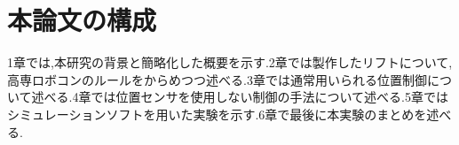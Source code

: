 \section{本論文の構成}
1章では,本研究の背景と簡略化した概要を示す.2章では製作したリフトについて,高専ロボコンのルールをからめつつ述べる.3章では通常用いられる位置制御について述べる.4章では位置センサを使用しない制御の手法について述べる.5章ではシミュレーションソフトを用いた実験を示す.6章で最後に本実験のまとめを述べる.